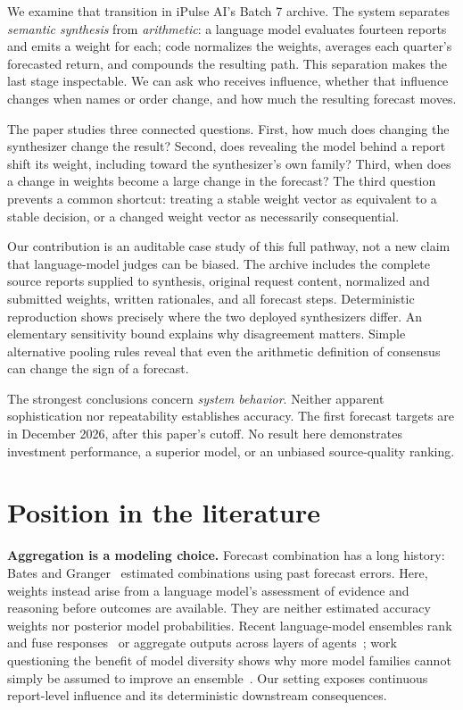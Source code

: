 \documentclass[11pt]{article}
\begin{document}
We examine that transition in iPulse AI's Batch 7 archive. The system separates \emph{semantic synthesis} from \emph{arithmetic}: a language model evaluates fourteen reports and emits a weight for each; code normalizes the weights, averages each quarter's forecasted return, and compounds the resulting path. This separation makes the last stage inspectable. We can ask who receives influence, whether that influence changes when names or order change, and how much the resulting forecast moves.

The paper studies three connected questions. First, how much does changing the synthesizer change the result? Second, does revealing the model behind a report shift its weight, including toward the synthesizer's own family? Third, when does a change in weights become a large change in the forecast? The third question prevents a common shortcut: treating a stable weight vector as equivalent to a stable decision, or a changed weight vector as necessarily consequential.

Our contribution is an auditable case study of this full pathway, not a new claim that language-model judges can be biased. The archive includes the complete source reports supplied to synthesis, original request content, normalized and submitted weights, written rationales, and all forecast steps. Deterministic reproduction shows precisely where the two deployed synthesizers differ. An elementary sensitivity bound explains why disagreement matters. Simple alternative pooling rules reveal that even the arithmetic definition of consensus can change the sign of a forecast.

The strongest conclusions concern \emph{system behavior}. Neither apparent sophistication nor repeatability establishes accuracy. The first forecast targets are in December 2026, after this paper's cutoff. No result here demonstrates investment performance, a superior model, or an unbiased source-quality ranking.


\section{Position in the literature}
\textbf{Aggregation is a modeling choice.} Forecast combination has a long history: Bates and Granger~\cite{bates} estimated combinations using past forecast errors. Here, weights instead arise from a language model's assessment of evidence and reasoning before outcomes are available. They are neither estimated accuracy weights nor posterior model probabilities. Recent language-model ensembles rank and fuse responses~\cite{blender} or aggregate outputs across layers of agents~\cite{moa}; work questioning the benefit of model diversity shows why more model families cannot simply be assumed to improve an ensemble~\cite{selfmoa}. Our setting exposes continuous report-level influence and its deterministic downstream consequences.
\end{document}
